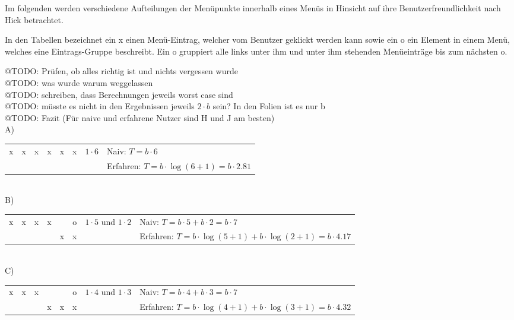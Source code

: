 \documentclass[a4paper,10pt]{article}
\begin{document}
\kopf
\renewcommand{\figurename}{Figure}

Im folgenden werden verschiedene Aufteilungen der Menüpunkte innerhalb eines Menüs in Hinsicht auf ihre Benutzerfreundlichkeit nach Hick betrachtet.

In den Tabellen bezeichnet ein x einen Menü-Eintrag, welcher vom Benutzer geklickt werden kann sowie ein o ein Element in einem Menü, welches eine Eintrags-Gruppe beschreibt. Ein o gruppiert alle links unter ihm und unter ihm stehenden Menüeinträge bis zum nächsten o.


@TODO: Prüfen, ob alles richtig ist und nichts vergessen wurde \\
@TODO: was wurde warum weggelassen \\
@TODO: schreiben, dass Berechnungen jeweils worst case sind \\
@TODO: müsste es nicht in den Ergebnissen jeweils $2\cdot b$ sein? In den Folien ist es nur b \\
@TODO: Fazit (Für naive und erfahrene Nutzer sind H und J am besten)\\

A)\\
\begin{tabular}{|c|c|c|c|c|c|l|l}
\cline{1-6} x & x & x & x & x & x & $1\cdot 6$ \: \: \: \: \: \: \: & Naiv: $T = b\cdot 6$ \\
\cline{1-6}   &   &   &   &   &   &   & Erfahren: $T = b\cdot \log(6+1) = b\cdot 2.81$\\
\cline{1-6}
\end{tabular} \\

B)\\
\begin{tabular}{|c|c|c|c|c|c|l|l}
\cline{1-6} x & x & x & x &   & o & $1\cdot 5$ und $1\cdot 2$ & Naiv: $T = b\cdot 5+b\cdot 2 = b\cdot 7$ \\
\cline{1-6}   &   &   &   & x & x &   & Erfahren: $T = b\cdot \log(5+1)+b\cdot \log(2+1) = b\cdot 4.17$ \\
\cline{1-6}
\end{tabular} \\

C)\\
\begin{tabular}{|c|c|c|c|c|c|l|l}
\cline{1-6} x & x & x &   &   & o & $1\cdot 4$ und $1\cdot 3$ & Naiv: $T = b\cdot 4+b\cdot 3 = b\cdot 7$ \\
\cline{1-6}   &   &   & x & x & x &   & Erfahren: $T = b\cdot \log(4+1)+b\cdot \log(3+1) = b\cdot 4.32$ \\
\cline{1-6}
\end{tabular} \\
\end{document}
